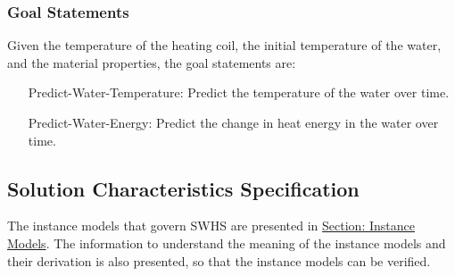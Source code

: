 \documentclass[12pt]{article}
\begin{document}
\subsubsection{Goal Statements}
\label{Sec:GoalStmt}
Given the temperature of the heating coil, the initial temperature of the water, and the material properties, the goal statements are:
\begin{itemize}
\item[Predict-Water-Temperature:\phantomsection\label{waterTempGS}]Predict the temperature of the water over time.
\item[Predict-Water-Energy:\phantomsection\label{waterEnergyGS}]Predict the change in heat energy in the water over time.
\end{itemize}
\subsection{Solution Characteristics Specification}
\label{Sec:SolCharSpec}
The instance models that govern SWHS are presented in \hyperref[Sec:IMs]{Section: Instance Models}. The information to understand the meaning of the instance models and their derivation is also presented, so that the instance models can be verified.
\end{document}

